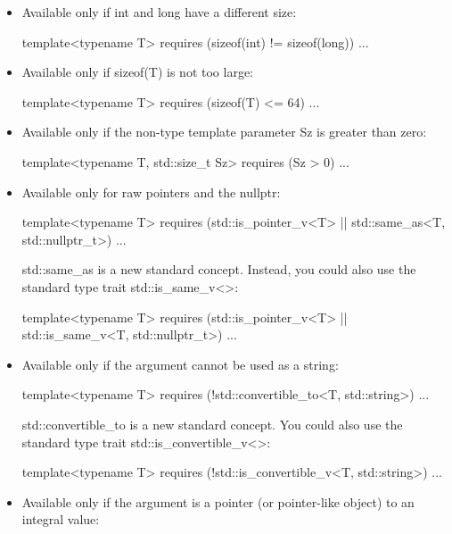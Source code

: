 \begin{itemize}
\item
Available only if int and long have a different size:

\begin{cpp}
template<typename T>
requires (sizeof(int) != sizeof(long))
...
\end{cpp}

\item
Available only if sizeof(T) is not too large:

\begin{cpp}
template<typename T>
requires (sizeof(T) <= 64)
...
\end{cpp}

\item
Available only if the non-type template parameter Sz is greater than zero:

\begin{cpp}
template<typename T, std::size_t Sz>
requires (Sz > 0)
...
\end{cpp}

\item
Available only for raw pointers and the nullptr:

\begin{cpp}
template<typename T>
requires (std::is_pointer_v<T> || std::same_as<T, std::nullptr_t>)
...
\end{cpp}

std::same\_as is a new standard concept. Instead, you could also use the standard type trait std::is\_same\_v<>:

\begin{cpp}
template<typename T>
requires (std::is_pointer_v<T> || std::is_same_v<T, std::nullptr_t>)
...
\end{cpp}

\item
Available only if the argument cannot be used as a string:

\begin{cpp}
template<typename T>
requires (!std::convertible_to<T, std::string>)
...
\end{cpp}

std::convertible\_to is a new standard concept. You could also use the standard type trait std::is\_convertible\_v<>:

\begin{cpp}
template<typename T>
requires (!std::is_convertible_v<T, std::string>)
...
\end{cpp}

\item
Available only if the argument is a pointer (or pointer-like object) to an integral value:


\end{itemize}

